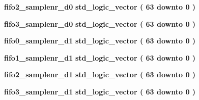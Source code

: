 \begin{DoxyCompactItemize}
\item 
{\bf fifo2\+\_\+samplenr\+\_\+d0} {\bfseries \textcolor{comment}{std\+\_\+logic\+\_\+vector}\textcolor{vhdlchar}{ }\textcolor{vhdlchar}{(}\textcolor{vhdlchar}{ }\textcolor{vhdlchar}{ } \textcolor{vhdldigit}{63} \textcolor{vhdlchar}{ }\textcolor{keywordflow}{downto}\textcolor{vhdlchar}{ }\textcolor{vhdlchar}{ } \textcolor{vhdldigit}{0} \textcolor{vhdlchar}{ }\textcolor{vhdlchar}{)}\textcolor{vhdlchar}{ }} 
\item 
{\bf fifo3\+\_\+samplenr\+\_\+d0} {\bfseries \textcolor{comment}{std\+\_\+logic\+\_\+vector}\textcolor{vhdlchar}{ }\textcolor{vhdlchar}{(}\textcolor{vhdlchar}{ }\textcolor{vhdlchar}{ } \textcolor{vhdldigit}{63} \textcolor{vhdlchar}{ }\textcolor{keywordflow}{downto}\textcolor{vhdlchar}{ }\textcolor{vhdlchar}{ } \textcolor{vhdldigit}{0} \textcolor{vhdlchar}{ }\textcolor{vhdlchar}{)}\textcolor{vhdlchar}{ }} 
\item 
{\bf fifo0\+\_\+samplenr\+\_\+d1} {\bfseries \textcolor{comment}{std\+\_\+logic\+\_\+vector}\textcolor{vhdlchar}{ }\textcolor{vhdlchar}{(}\textcolor{vhdlchar}{ }\textcolor{vhdlchar}{ } \textcolor{vhdldigit}{63} \textcolor{vhdlchar}{ }\textcolor{keywordflow}{downto}\textcolor{vhdlchar}{ }\textcolor{vhdlchar}{ } \textcolor{vhdldigit}{0} \textcolor{vhdlchar}{ }\textcolor{vhdlchar}{)}\textcolor{vhdlchar}{ }} 
\item 
{\bf fifo1\+\_\+samplenr\+\_\+d1} {\bfseries \textcolor{comment}{std\+\_\+logic\+\_\+vector}\textcolor{vhdlchar}{ }\textcolor{vhdlchar}{(}\textcolor{vhdlchar}{ }\textcolor{vhdlchar}{ } \textcolor{vhdldigit}{63} \textcolor{vhdlchar}{ }\textcolor{keywordflow}{downto}\textcolor{vhdlchar}{ }\textcolor{vhdlchar}{ } \textcolor{vhdldigit}{0} \textcolor{vhdlchar}{ }\textcolor{vhdlchar}{)}\textcolor{vhdlchar}{ }} 
\item 
{\bf fifo2\+\_\+samplenr\+\_\+d1} {\bfseries \textcolor{comment}{std\+\_\+logic\+\_\+vector}\textcolor{vhdlchar}{ }\textcolor{vhdlchar}{(}\textcolor{vhdlchar}{ }\textcolor{vhdlchar}{ } \textcolor{vhdldigit}{63} \textcolor{vhdlchar}{ }\textcolor{keywordflow}{downto}\textcolor{vhdlchar}{ }\textcolor{vhdlchar}{ } \textcolor{vhdldigit}{0} \textcolor{vhdlchar}{ }\textcolor{vhdlchar}{)}\textcolor{vhdlchar}{ }} 
\item 
{\bf fifo3\+\_\+samplenr\+\_\+d1} {\bfseries \textcolor{comment}{std\+\_\+logic\+\_\+vector}\textcolor{vhdlchar}{ }\textcolor{vhdlchar}{(}\textcolor{vhdlchar}{ }\textcolor{vhdlchar}{ } \textcolor{vhdldigit}{63} \textcolor{vhdlchar}{ }\textcolor{keywordflow}{downto}\textcolor{vhdlchar}{ }\textcolor{vhdlchar}{ } \textcolor{vhdldigit}{0} \textcolor{vhdlchar}{ }\textcolor{vhdlchar}{)}\textcolor{vhdlchar}{ }} 

\end{DoxyCompactItemize}
